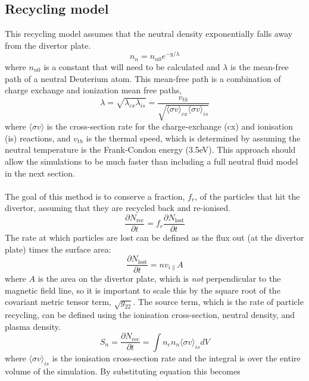 \documentclass[12pt,a4paper]{article}
\newcommand{\deriv}[2]{\frac{\partial #1}{\partial #2}}
\begin{document}
\subsection{Recycling model}
This recycling model assumes that the neutral density exponentially falls away from the divertor plate.
\begin{equation}
n_n = n_{n0} e^{-y/\lambda} \label{eqn:exp_neutral_density}
\end{equation}
where $n_{n0}$ is a constant that will need to be calculated and $\lambda$ is the mean-free path of a neutral Deuterium atom.  This mean-free path is a combination of charge exchange and ionization mean free paths, 
\begin{equation}
\lambda = \sqrt{\lambda_{cx}\lambda_{is}} = \frac{v_{th}}{\sqrt{\langle\sigma v\rangle_{cx} \langle\sigma v\rangle_{is} }}
\end{equation}
where $\langle\sigma v\rangle$ is the cross-section rate for the charge-exchange (cx) and ionisation (is) reactions, and $v_{th}$ is the thermal speed, which is determined by assuming the neutral temperature is the Frank-Condon energy (3.5eV).  This approach should allow the simulations to be much faster than including a full neutral fluid model in the next section.\\
\\
The goal of this method is to conserve a fraction, $f_r$, of the particles that hit the divertor, assuming that they are recycled back and re-ionised.
\begin{equation}
\deriv{N_{\text{rec}}}{t} = f_r \deriv{N_{\text{lost}}}{t}  %
\end{equation}
The rate at which particles are lost can be defined as the flux out (at the divertor plate) times the surface area:
\begin{equation}
\deriv{N_{\text{lost}}}{t} = nv_{i\parallel} A 
\end{equation} 
where $A$ is the area on the divertor plate, which is \emph{not} perpendicular to the magnetic field line, so it is important to scale this by the square root of the covariant metric tensor term, $\displaystyle\sqrt{g_{22}}$.  The source term, which is the rate of particle recycling, can be defined using the ionisation cross-section, neutral density, and plasma density.
\begin{equation}
S_n = \deriv{N_{\text{rec}}}{t} = \int n_e n_n \langle \sigma v \rangle_{is} dV
\end{equation}
where $\langle\sigma v\rangle_{is}$ is the ionisation cross-section rate and the integral is over the entire volume of the simulation.  By substituting equation this becomes
\end{document}
